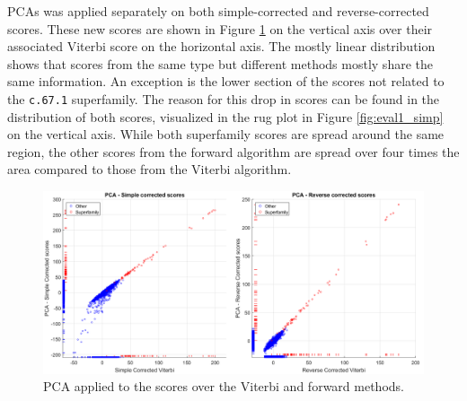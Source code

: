 \aclp{PCA} was applied separately on both simple-corrected and reverse-corrected scores. 
These new scores are shown in Figure \ref{fig:PCAcorrSame} on the vertical axis over their associated Viterbi score on the horizontal axis. The mostly linear distribution shows that scores from the same type but different methods mostly share the same information. An exception is the lower section of the scores not related to the \texttt{c.67.1} superfamily. The reason for this drop in scores can be found in the distribution of both scores, visualized in the rug plot in Figure \ref{fig:eval1_simp} on the vertical axis. While both superfamily scores are spread around the same region, the other scores from the forward algorithm are spread over four times the area compared to those from the Viterbi algorithm.  

\begin{figure}[H]
	\begin{center}
		\includegraphics[width=\textwidth]{fig/PCA/pca_both_same}
	\end{center}
	\caption{\acs{PCA} applied to the scores over the Viterbi and forward methods.}
	\label{fig:PCAcorrSame}
\end{figure}

 

